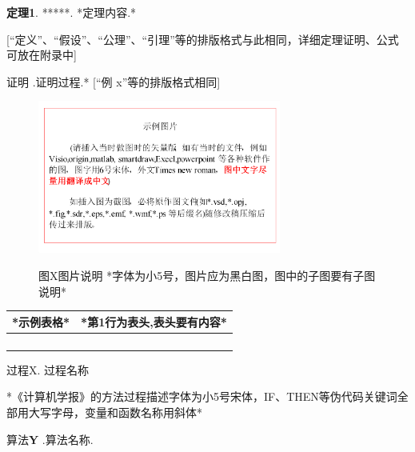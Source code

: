 \documentclass[10.5pt,compsoc]{CjC}
\theoremstyle{mystyle}
\begin{document}
{\heiti\textbf{定理1}. }\quad ******. *定理内容.*

[``定义''、``假设''、``公理''、``引理''等的排版格式与此相同，详细定理证明、公式可放在附录中]

{ \fangsong 证明 }.\quad  *证明过程.* [``例 x''等的排版格式相同]


\begin{figure}[htbp]
\centerline{\includegraphics[width=3.15in,height=1.98in]{CJC1.pdf}}
图X\quad  图片说明 *字体为小5号，图片应为黑白图，图中的子图要有子图说明*
\label{fig1}
\end{figure}

\begin{table}[htbp]
\vspace {-2.5mm}
\begin{center}
\begin{tabular}{ll}
\toprule
*示例表格*&*第1行为表头,表头要有内容* \\
\hline
&
 \\
&
 \\
&
 \\
&
 \\
\bottomrule
\end{tabular}
\label{tab1}
\end{center}
\end{table}

\heiti 过程X. \quad 过程名称

{*《计算机学报》的方法过程描述字体为小5号宋体，IF、THEN等伪代码关键词全部用大写字母，变量和函数名称用斜体*}


\heiti 算法\textbf{Y} .\quad 算法名称.

\vspace {3mm}
\end{document}
